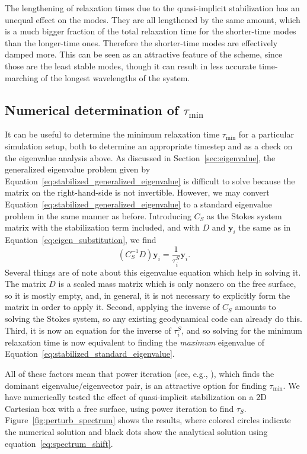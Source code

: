 \documentclass[preprint,12pt,authoryear]{elsarticle}
\begin{document}
The lengthening of relaxation times due to the quasi-implicit stabilization has an unequal 
effect on the modes. They are all lengthened by the same amount, which is a much bigger 
fraction of the total relaxation time for the shorter-time modes than the longer-time ones.
Therefore the shorter-time modes are effectively damped more.
This can be seen as an attractive feature of the scheme, since those are the least stable modes,
though it can result in less accurate time-marching of the longest wavelengths of the system.

\subsection{Numerical determination of $\tau_\mathrm{min}$}

It can be useful to determine the minimum relaxation time $\tau_{\mathrm{min}}$ for a particular
simulation setup, both to determine an appropriate timestep and as a check on the eigenvalue
analysis above. As discussed in Section~\ref{sec:eigenvalue}, the generalized eigenvalue problem
given by Equation~\eqref{eq:stabilized_generalized_eigenvalue} is difficult to solve because the matrix on
the right-hand-side is not invertible.
However, we may convert Equation~\eqref{eq:stabilized_generalized_eigenvalue} to a standard eigenvalue problem
in the same manner as before. Introducing $C_S$ as the Stokes system matrix with the stabilization term
included, and with $D$ and $\mathbf{y}_i$ the same as in Equation~\eqref{eq:eigen_substitution}, we find
\begin{equation}
(C_S^{-1}D)\mathbf{y}_i = \frac{1}{\tau^S_i} \mathbf{y}_i.
\label{eq:stabilized_standard_eigenvalue}
\end{equation}
Several things are of note about this eigenvalue equation which help in solving it.
The matrix $D$ is a scaled mass matrix which is only nonzero on the free surface,
so it is mostly empty, and, in general, it is not necessary to explicitly form the
matrix in order to apply it.
Second, applying the inverse of $C_S$ amounts to solving the Stokes system, so any
existing geodynamical code can already do this.
Third, it is now an equation for the inverse of $\tau^S_i$, and so solving for the 
minimum relaxation time is now equivalent to finding the \emph{maximum} eigenvalue
of Equation~\eqref{eq:stabilized_standard_eigenvalue}.

All of these factors mean that power iteration (see, e.g., \citet{golub2012matrix}),
which finds the dominant eigenvalue/eigenvector pair, is an attractive option for finding $\tau_\mathrm{min}$.
We have numerically tested the effect of quasi-implicit stabilization on a 2D Cartesian box with a free surface,
using power iteration to find $\tau_S$.
Figure~\ref{fig:perturb_spectrum} shows the results, where colored circles indicate the numerical
solution and black dots show the analytical solution using equation~\eqref{eq:spectrum_shift}.
\end{document}

